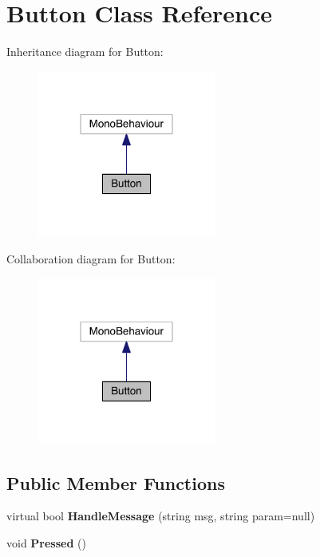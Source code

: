 \hypertarget{class_button}{}\section{Button Class Reference}
\label{class_button}


Inheritance diagram for Button\+:\nopagebreak
\begin{figure}[H]
\begin{center}
\leavevmode
\includegraphics[width=166pt]{class_button__inherit__graph}
\end{center}
\end{figure}


Collaboration diagram for Button\+:\nopagebreak
\begin{figure}[H]
\begin{center}
\leavevmode
\includegraphics[width=166pt]{class_button__coll__graph}
\end{center}
\end{figure}
\subsection*{Public Member Functions}
\begin{DoxyCompactItemize}
\item 
virtual bool {\bfseries Handle\+Message} (string msg, string param=null)\hypertarget{class_button_aac84d9ad4a1126ce1ccdfc719d1b9356}{}\label{class_button_aac84d9ad4a1126ce1ccdfc719d1b9356}

\item 
void {\bfseries Pressed} ()\hypertarget{class_button_a32acc0b75cda56a10936fb4590d52826}{}\label{class_button_a32acc0b75cda56a10936fb4590d52826}

\end{DoxyCompactItemize}
